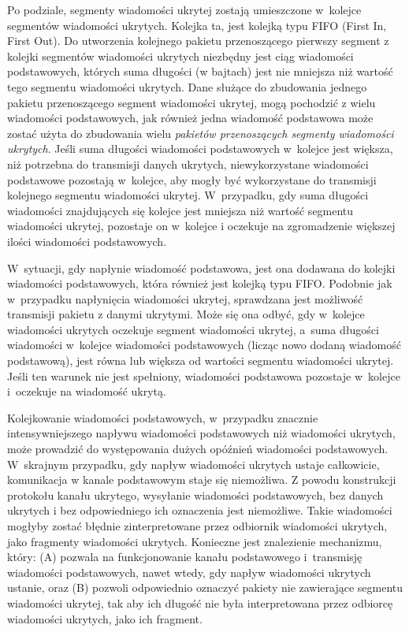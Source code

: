 \documentclass[a4paper, twoside, 12pt]{report}
\begin{document}
    Po podziale, segmenty wiadomości ukrytej zostają umieszczone w~kolejce segmentów wiadomości
    ukrytych. Kolejka ta, jest kolejką typu FIFO (First In, First Out).
    Do utworzenia kolejnego pakietu przenoszącego pierwszy segment z kolejki
    segmentów wiadomości ukrytych niezbędny jest ciąg wiadomości podstawowych,
    których suma długości (w bajtach) jest nie mniejsza niż wartość tego segmentu wiadomości ukrytych.
    Dane służące do zbudowania
    jednego pakietu przenoszącego segment wiadomości ukrytej, mogą pochodzić z wielu wiadomości
    podstawowych, jak również jedna wiadomość podstawowa może zostać użyta do zbudowania
    wielu \emph{pakietów przenoszących segmenty wiadomości ukrytych}. Jeśli suma długości wiadomości
    podstawowych w~kolejce jest większa, niż potrzebna do transmisji danych ukrytych, niewykorzystane
    wiadomości podstawowe pozostają w~kolejce, aby mogły być wykorzystane do transmisji
    kolejnego segmentu wiadomości ukrytej.
    W~przypadku, gdy suma długości wiadomości znajdujących się kolejce jest mniejsza
    niż wartość segmentu wiadomości ukrytej, pozostaje on w~kolejce i oczekuje
    na zgromadzenie większej ilości wiadomości podstawowych.

    W~sytuacji, gdy napłynie wiadomość podstawowa, jest ona dodawana do kolejki
    wiadomości podstawowych, która również jest kolejką typu FIFO.
    Podobnie jak w~przypadku napłynięcia wiadomości ukrytej, sprawdzana jest możliwość
    transmisji pakietu z danymi ukrytymi. Może się ona odbyć, gdy w~kolejce wiadomości
    ukrytych oczekuje segment wiadomości ukrytej, a~suma długości wiadomości w~kolejce wiadomości
    podstawowych (licząc nowo dodaną wiadomość podstawową), jest równa lub większa
    od wartości segmentu wiadomości ukrytej. Jeśli ten warunek nie jest spełniony, wiadomości podstawowa
    pozostaje w~kolejce i~oczekuje na wiadomość ukrytą.

    Kolejkowanie wiadomości podstawowych, w~przypadku znacznie intensywniejszego
    napływu wiadomości podstawowych niż wiadomości ukrytych, może prowadzić do
    występowania dużych opóźnień wiadomości podstawowych. W~skrajnym przypadku,
    gdy napływ wiadomości ukrytych ustaje całkowicie, komunikacja w kanale podstawowym staje się niemożliwa.
    Z powodu konstrukcji protokołu kanału
    ukrytego, wysyłanie wiadomości podstawowych, bez danych ukrytych i bez odpowiedniego ich oznaczenia jest niemożliwe.
    Takie wiadomości mogłyby zostać błędnie zinterpretowane przez odbiornik wiadomości
    ukrytych, jako fragmenty wiadomości ukrytych. Konieczne jest znalezienie mechanizmu,
    który: (A) pozwala na funkcjonowanie kanału podstawowego i~transmisję wiadomości
    podstawowych, nawet wtedy, gdy napływ wiadomości ukrytych ustanie, oraz (B)
    pozwoli odpowiednio oznaczyć pakiety nie zawierające segmentu wiadomości ukrytej, tak aby ich długość
    nie była interpretowana przez odbiorcę wiadomości ukrytych, jako ich fragment.
\end{document}
